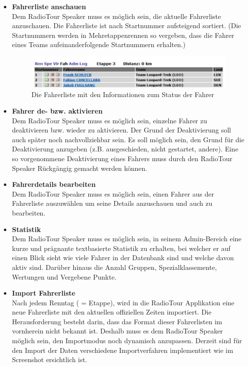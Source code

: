 \begin{itemize}
\item \textbf{Fahrerliste anschauen}\\
Dem RadioTour Speaker muss es möglich sein, die aktuelle Fahrerliste anzuschauen. Die Fahrerliste ist nach Startnummer aufsteigend sortiert. (Die Startnummern werden in Mehretappenrennen so vergeben, dass die Fahrer eines Teams aufeinanderfolgende Startnummern erhalten.)

\begin{figure}[h!]
  \caption{Die Fahrerliste mit den Informationen zum Status der Fahrer}
  \begin{center}
    \includegraphics{05bericht/images/uc06_fahrerliste.png}
  \end{center}
\end{figure}

\item \textbf{Fahrer de- bzw. aktivieren}\\
Dem RadioTour Speaker muss es möglich sein, einzelne Fahrer zu deaktivieren bzw. wieder zu aktivieren. Der Grund der Deaktivierung soll auch später noch nachvollziehbar sein. Es soll möglich sein, den Grund für die Deaktivierung anzugeben (z.B. ausgeschieden, nicht gestartet, andere). 
Eine so vorgenommene Deaktivierung eines Fahrers muss durch den RadioTour Speaker Rückgängig gemacht werden können.

\item \textbf{Fahrerdetails bearbeiten}\\
Dem RadioTour Speaker muss es möglich sein, einen Fahrer aus der Fahrerliste auszuwählen um seine Details anzuschauen und auch zu bearbeiten. 

\item \textbf{Statistik}\\
Dem RadioTour Speaker muss es möglich sein, in seinem Admin-Bereich eine kurze und prägnante textbasierte Statistik zu erhalten, bei welcher er auf einen Blick sieht wie viele Fahrer in der Datenbank sind und welche davon aktiv sind. Darüber hinaus die Anzahl Gruppen, Spezialklassemente, Wertungen und Vergebene Punkte.

\item \textbf{Import Fahrerliste}\\
Nach jedem Renntag ( = Etappe), wird in die RadioTour Applikation eine neue Fahrerliste mit den aktuellen offiziellen Zeiten importiert. Die Herausforderung besteht darin, dass das Format dieser Fahrerlisten im vornherein nicht bekannt ist. Deshalb muss es dem RadioTour Speaker möglich sein, den Importmodus noch dynamisch anzupassen. Derzeit sind für den Import der Daten verschiedene Importverfahren implementiert wie im Screenshot ersichtlich ist.


\end{itemize}
